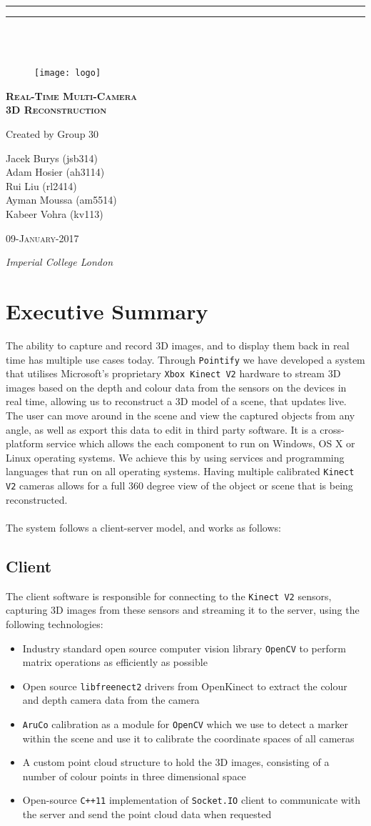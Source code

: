 \documentclass{article}
\newcommand*{\titleGP}{\begingroup %
\centering %
\vspace*{\baselineskip} %

\rule{\textwidth}{0pt}\vspace*{-\baselineskip}\vspace*{2pt} %
\rule{\textwidth}{0pt}\\[\baselineskip] %

{\LARGE ~}\\[0\baselineskip] %

\begin{figure}[h]
  \centering
  \texttt{[image: logo]}
\end{figure}


\scshape  %
\textbf{\LARGE Real-Time Multi-Camera}\\

\vspace*{1\baselineskip}
\textbf{\LARGE 3D Reconstruction}\par

\vspace*{5\baselineskip}

Created by Group 30\\[\baselineskip]
{\Large Jacek Burys (jsb314) \\ Adam Hosier (ah3114) \\ Rui Liu (rl2414) \\  Ayman Moussa (am5514) \\Kabeer Vohra (kv113) \\  \par} %

\vfill 

{\scshape 09-January-2017} \\[0.3\baselineskip] %
{\itshape Imperial College London\par} %

\endgroup}
\begin{document}
 

\titleGP
\thispagestyle{empty}

\newpage
\setcounter{page}{1}
\tableofcontents

\newpage
\iffalse
\section{Executive Summary}
The ability to capture and record 3D images, and to display them back in real time has multiple use cases today. Through \texttt{Pointify} we have developed a system that utilises Microsoft's proprietary \texttt{Xbox Kinect V2} hardware to stream 3D images based on the depth and colour data from the sensors on the devices in real time, allowing us to reconstruct a 3D model of a scene, that updates live. The user can move around in the scene and view the captured objects from any angle, as well as export this data to edit in third party software. It is a cross-platform service which allows the each component to run on Windows, OS X or Linux operating systems. We achieve this by using services and programming languages that run on all operating systems. Having multiple calibrated \texttt{Kinect V2} cameras allows for a full 360 degree view of the object or scene that is being reconstructed. 
\\\\
The system follows a client-server model, and works as follows:
\\
\subsection{Client}
The client software is responsible for connecting to the \texttt{Kinect V2} sensors, capturing 3D images from these sensors and streaming it to the server, using the following technologies:
\begin{itemize}
\item Industry standard open source computer vision library \texttt{OpenCV} \cite{opencv} to perform matrix operations as efficiently as possible
\item Open source \texttt{libfreenect2} \cite{libfreenect} drivers from OpenKinect to extract the colour and depth camera data from the camera
\item \texttt{AruCo} \cite{aruco} calibration as a module for \texttt{OpenCV} which we use to detect a marker within the scene and use it to calibrate the coordinate spaces of all cameras
\item A custom point cloud structure to hold the 3D images, consisting of a number of colour points in three dimensional space
\item Open-source \texttt{C++11} implementation of \texttt{Socket.IO} \cite{socketio} client to communicate with the server and send the point cloud data when requested
\end{itemize}
\vspace{1mm}
\end{document}
